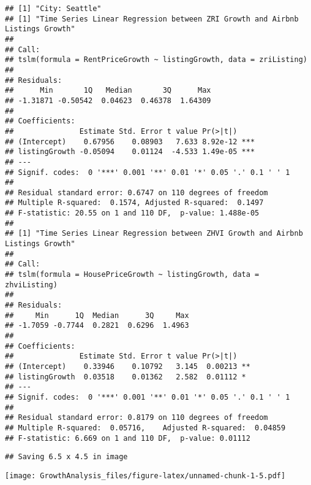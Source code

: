 \documentclass[
]{article}
\begin{document}
\begin{verbatim}
## [1] "City: Seattle"
## [1] "Time Series Linear Regression between ZRI Growth and Airbnb Listings Growth"
## 
## Call:
## tslm(formula = RentPriceGrowth ~ listingGrowth, data = zriListing)
## 
## Residuals:
##      Min       1Q   Median       3Q      Max 
## -1.31871 -0.50542  0.04623  0.46378  1.64309 
## 
## Coefficients:
##               Estimate Std. Error t value Pr(>|t|)    
## (Intercept)    0.67956    0.08903   7.633 8.92e-12 ***
## listingGrowth -0.05094    0.01124  -4.533 1.49e-05 ***
## ---
## Signif. codes:  0 '***' 0.001 '**' 0.01 '*' 0.05 '.' 0.1 ' ' 1
## 
## Residual standard error: 0.6747 on 110 degrees of freedom
## Multiple R-squared:  0.1574, Adjusted R-squared:  0.1497 
## F-statistic: 20.55 on 1 and 110 DF,  p-value: 1.488e-05
## 
## [1] "Time Series Linear Regression between ZHVI Growth and Airbnb Listings Growth"
## 
## Call:
## tslm(formula = HousePriceGrowth ~ listingGrowth, data = zhviListing)
## 
## Residuals:
##     Min      1Q  Median      3Q     Max 
## -1.7059 -0.7744  0.2821  0.6296  1.4963 
## 
## Coefficients:
##               Estimate Std. Error t value Pr(>|t|)   
## (Intercept)    0.33946    0.10792   3.145  0.00213 **
## listingGrowth  0.03518    0.01362   2.582  0.01112 * 
## ---
## Signif. codes:  0 '***' 0.001 '**' 0.01 '*' 0.05 '.' 0.1 ' ' 1
## 
## Residual standard error: 0.8179 on 110 degrees of freedom
## Multiple R-squared:  0.05716,    Adjusted R-squared:  0.04859 
## F-statistic: 6.669 on 1 and 110 DF,  p-value: 0.01112
\end{verbatim}

\begin{verbatim}
## Saving 6.5 x 4.5 in image
\end{verbatim}

\texttt{[image: GrowthAnalysis\_files/figure-latex/unnamed-chunk-1-5.pdf]}
\end{document}
